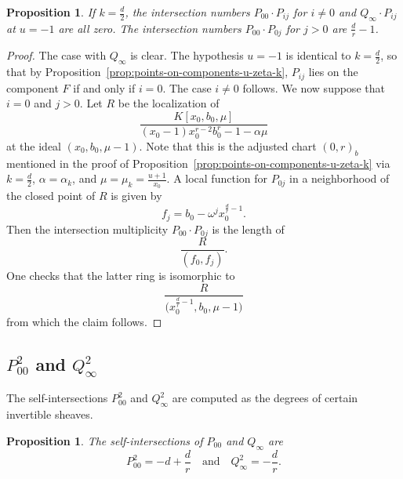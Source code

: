 \documentclass[reqno]{amsart}
\newtheorem{proposition}[thm]{Proposition}
\theoremstyle{definition}
\theoremstyle{remark}
\begin{document}
\begin{proposition}\label{prop:local-intersections-u-minus-1}
  If $k = \frac{d}{2}$, the intersection numbers $P_{00} \cdot P_{ij}$ for $i \neq 0$ and $Q_{\infty} \cdot P_{ij}$ at $u = -1$ are all zero. The intersection numbers $P_{00} \cdot P_{0j}$ for $j > 0$ are $\frac{d}{r} - 1$.
\end{proposition}

\begin{proof}
  The case with $Q_\infty$ is clear. The hypothesis $u = -1$ is identical to $k = \frac{d}{2}$, so that by Proposition~\ref{prop:points-on-components-u-zeta-k}, $P_{ij}$ lies on the component $F$ if and only if $i = 0$. The case $i \neq 0$ follows. We now suppose that $i = 0$ and $j > 0$. Let $R$ be the localization of
  \[
  \frac{K[x_0,b_0,\mu]}{(x_0 - 1)x_0^{r-2}b_0^r - 1 - \alpha \mu}
  \]
  at the ideal $(x_0, b_0, \mu - 1)$. Note that this is the adjusted chart $(0,r)_b$ mentioned in the proof of Proposition~\ref{prop:points-on-components-u-zeta-k} via $k = \frac{d}{2}$, $\alpha = \alpha_k$, and $\mu = \mu_k = \frac{u+1}{x_0}$. A local function for $P_{0j}$ in a neighborhood of the closed point of $R$ is given by
  \[
  f_j = b_0 - \omega^j x_0^{\frac{d}{r} - 1}.
  \]
  Then the intersection multiplicity $P_{00} \cdot P_{0j}$ is the length of 
  \[
  \frac{R}{(f_0, f_j)}.
  \]
  One checks that the latter ring is isomorphic to
  \[
  \frac{R}{\bigg(x_0^{\frac{d}{r} - 1}, b_0, \mu - 1\bigg)}
  \]
  from which the claim follows.
\end{proof}

\subsection{$P_{00}^2$ and $Q_\infty^2$}
\label{sec:p_002-q_infty2}

The self-intersections $P_{00}^2$ and $Q_\infty^2$ are computed as the degrees of certain invertible sheaves.
\begin{proposition}\label{prop:Q-infty-self-intersection}
  The self-intersections of $P_{00}$ and $Q_\infty$ are
  \[
  P_{00}^2 = -d + \frac{d}{r} \quad \text{and} \quad Q_\infty^2 = -\frac{d}{r}.
  \]
\end{proposition}
\end{document}

